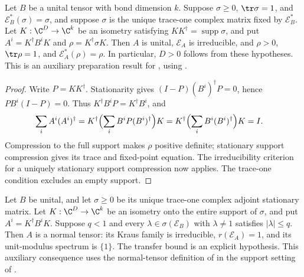 \begin{lemma}
    \label{thm:spc_aux_stationary_support_preparation}
    \leanok
    Let $B$ be a unital tensor with bond dimension $k$.
    Suppose $\sigma\geq0$, $\tr\sigma=1$, and
    $\mathcal E_B^*(\sigma)=\sigma$, and suppose $\sigma$ is the unique
    trace-one complex matrix fixed by $\mathcal E_B^*$.
    Let $K:\C^D\to\C^k$ be an isometry satisfying
    $KK^\dagger=\operatorname{supp}\sigma$, and put
    $A^i=K^\dagger B^iK$ and $\rho=K^\dagger\sigma K$.
    Then $A$ is unital, $\mathcal E_A$ is irreducible, and
    $\rho>0$, $\tr\rho=1$, and $\mathcal E_A^*(\rho)=\rho$.
    In particular, $D>0$ follows from these hypotheses.
    This is an auxiliary preparation result for
    \cite[Appendix~C, lines~2653--2717]{Schuch2011Phases}, using
    \cite[Lemma~6.4 and Theorem~6.3]{Wolf2012Quantum}.
\end{lemma}

\begin{proof}\leanok
    Write $P=KK^\dagger$. Stationarity gives
    $(I-P)(B^i)^\dagger P=0$, hence $PB^i(I-P)=0$.
    Thus $K^\dagger B^iP=K^\dagger B^i$, and
    \begin{align}
        \sum_i A^i(A^i)^\dagger
         & =K^\dagger\Bigl(\sum_i B^iP(B^i)^\dagger\Bigr)K
        =K^\dagger\Bigl(\sum_i B^i(B^i)^\dagger\Bigr)K=I.\notag
    \end{align}
    Compression to the full support makes $\rho$ positive definite;
    stationary support compression gives its trace and fixed-point equation.
    The irreducibility criterion for a uniquely stationary support compression
    now applies. The trace-one condition excludes an empty support.
\end{proof}

\begin{lemma}
    \label{thm:spc_aux_stationary_support_normality}
    \leanok
    Let $B$ be unital, and let $\sigma\geq0$ be its unique trace-one complex
    adjoint stationary matrix. Let $K:\C^D\to\C^k$ be an isometry onto
    the entire support of $\sigma$, and put $A^i=K^\dagger B^iK$.
    Suppose $q<1$ and every $\lambda\in\sigma(\mathcal E_B)$ with
    $\lambda\neq1$ satisfies $|\lambda|\leq q$.
    Then $A$ is a normal tensor: its Kraus family is irreducible,
    $r(\mathcal E_A)=1$, and its unit-modulus spectrum is $\{1\}$.
    The transfer bound is an explicit hypothesis.
    This auxiliary consequence uses the normal-tensor definition of
    \cite[lines~231--235]{Cirac2016MPDO_arXiv} in the support setting of
    \cite[Appendix~C, lines~2653--2717]{Schuch2011Phases}.
\end{lemma}

